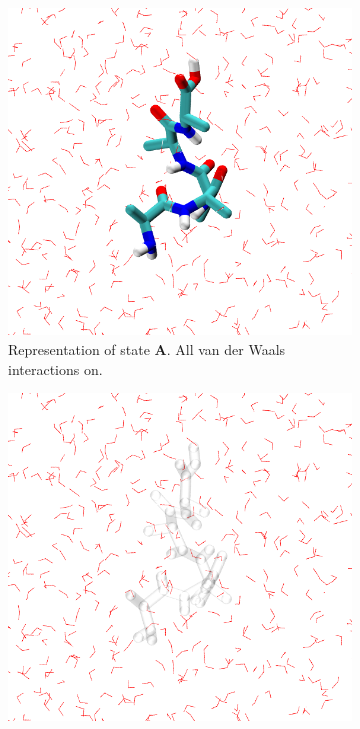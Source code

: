 \begin{figure}[h]
    \centering
    \begin{subfigure}[t]{0.45\textwidth}
    \includegraphics[width=\textwidth]{Figures/Chapter_5/StateA.png}
    \caption{Representation of state \textbf{A}. All van der Waals interactions on.}
    \label{fig:StateA}
    \end{subfigure}
    \hspace{0.5cm}
    \begin{subfigure}[t]{0.45\textwidth}
    \includegraphics[width=\textwidth]{Figures/Chapter_5/StateB.png}

\end{subfigure}
\end{figure}
